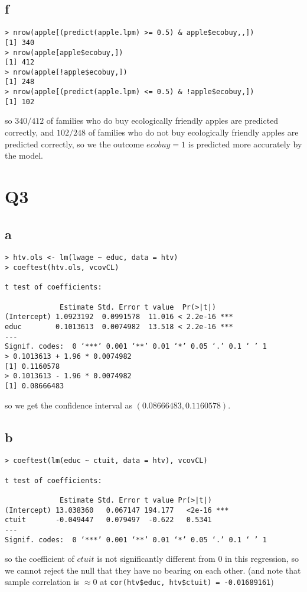 \documentclass[12pt,letterpaper]{article}
\theoremstyle{definition}
\begin{document}
\subsection*{f}

\begin{Verbatim}[fontsize=\small]
> nrow(apple[(predict(apple.lpm) >= 0.5) & apple$ecobuy,,])
[1] 340
> nrow(apple[apple$ecobuy,])
[1] 412
> nrow(apple[!apple$ecobuy,])
[1] 248
> nrow(apple[(predict(apple.lpm) <= 0.5) & !apple$ecobuy,])
[1] 102
\end{Verbatim}
so $340/412$ of families who do buy ecologically friendly apples are predicted correctly, and $102/248$ of families who do not buy ecologically friendly apples are predicted correctly, so we the outcome $ecobuy = 1$ is predicted more accurately by the model.

\section*{Q3}
\subsection*{a}
\begin{Verbatim}[fontsize=\small]
> htv.ols <- lm(lwage ~ educ, data = htv)
> coeftest(htv.ols, vcovCL)

t test of coefficients:

             Estimate Std. Error t value  Pr(>|t|)
(Intercept) 1.0923192  0.0991578  11.016 < 2.2e-16 ***
educ        0.1013613  0.0074982  13.518 < 2.2e-16 ***
---
Signif. codes:  0 ‘***’ 0.001 ‘**’ 0.01 ‘*’ 0.05 ‘.’ 0.1 ‘ ’ 1
> 0.1013613 + 1.96 * 0.0074982
[1] 0.1160578
> 0.1013613 - 1.96 * 0.0074982
[1] 0.08666483
\end{Verbatim}
so we get the confidence interval as $(0.08666483, 0.1160578)$.


\subsection*{b}

\begin{Verbatim}[fontsize=\small]
> coeftest(lm(educ ~ ctuit, data = htv), vcovCL)

t test of coefficients:

             Estimate Std. Error t value Pr(>|t|)
(Intercept) 13.038360   0.067147 194.177   <2e-16 ***
ctuit       -0.049447   0.079497  -0.622   0.5341
---
Signif. codes:  0 ‘***’ 0.001 ‘**’ 0.01 ‘*’ 0.05 ‘.’ 0.1 ‘ ’ 1
\end{Verbatim}
so the coefficient of $ctuit$ is not significantly different from $0$ in this regression, so we cannot reject the null that they have no bearing on each other. (and note that sample correlation is $\approx 0$ at \verb|cor(htv$educ, htv$ctuit) = -0.01689161|)
\end{document}

